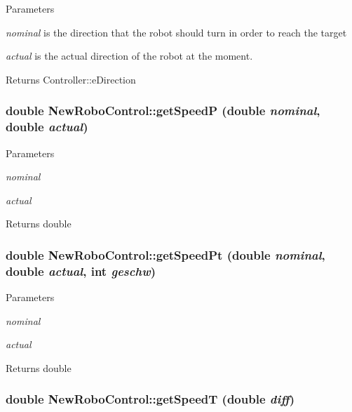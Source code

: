 \begin{DoxyParams}{Parameters}
\item[{\em nominal}]is the direction that the robot should turn in order to reach the target \item[{\em actual}]is the actual direction of the robot at the moment. \end{DoxyParams}
\begin{DoxyReturn}{Returns}
Controller::eDirection 
\end{DoxyReturn}
\hypertarget{classNewRoboControl_ab2f2407b40c535ed734049e8e1ed71e6}{
\subsubsection[{getSpeedP}]{\setlength{\rightskip}{0pt plus 5cm}double NewRoboControl::getSpeedP (double {\em nominal}, \/  double {\em actual})}}
\label{classNewRoboControl_ab2f2407b40c535ed734049e8e1ed71e6}

\begin{DoxyParams}{Parameters}
\item[{\em nominal}]\item[{\em actual}]\end{DoxyParams}
\begin{DoxyReturn}{Returns}
double 
\end{DoxyReturn}
\hypertarget{classNewRoboControl_ac1f5cb8932193d5e8315bb19aeddb3fa}{
\subsubsection[{getSpeedPt}]{\setlength{\rightskip}{0pt plus 5cm}double NewRoboControl::getSpeedPt (double {\em nominal}, \/  double {\em actual}, \/  int {\em geschw})}}
\label{classNewRoboControl_ac1f5cb8932193d5e8315bb19aeddb3fa}

\begin{DoxyParams}{Parameters}
\item[{\em nominal}]\item[{\em actual}]\end{DoxyParams}
\begin{DoxyReturn}{Returns}
double 
\end{DoxyReturn}
\hypertarget{classNewRoboControl_a0c5f29bb2dee1faf96725b80ddc64398}{
\subsubsection[{getSpeedT}]{\setlength{\rightskip}{0pt plus 5cm}double NewRoboControl::getSpeedT (double {\em diff})}}
\label{classNewRoboControl_a0c5f29bb2dee1faf96725b80ddc64398}

